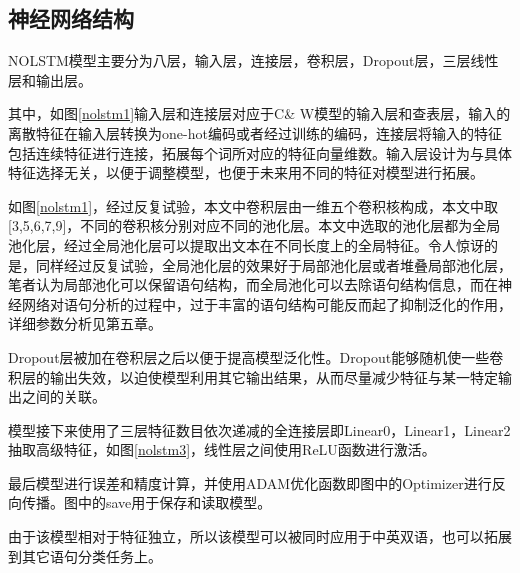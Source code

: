 \subsection{神经网络结构}
NOLSTM模型主要分为八层，输入层，连接层，卷积层，Dropout层，三层线性层和输出层。\par
其中，如图\ref{nolstm1}输入层和连接层对应于C\& W模型的输入层和查表层，输入的离散特征在输入层转换为one-hot编码或者经过训练的编码，连接层将输入的特征包括连续特征进行连接，拓展每个词所对应的特征向量维数。输入层设计为与具体特征选择无关，以便于调整模型，也便于未来用不同的特征对模型进行拓展。\par
如图\ref{nolstm1}，经过反复试验，本文中卷积层由一维五个卷积核构成，本文中取[3,5,6,7,9]，不同的卷积核分别对应不同的池化层。本文中选取的池化层都为全局池化层，经过全局池化层可以提取出文本在不同长度上的全局特征。令人惊讶的是，同样经过反复试验，全局池化层的效果好于局部池化层或者堆叠局部池化层，笔者认为局部池化可以保留语句结构，而全局池化可以去除语句结构信息，而在神经网络对语句分析的过程中，过于丰富的语句结构可能反而起了抑制泛化的作用，详细参数分析见第五章。\par
Dropout层被加在卷积层之后以便于提高模型泛化性。Dropout能够随机使一些卷积层的输出失效，以迫使模型利用其它输出结果，从而尽量减少特征与某一特定输出之间的关联。\par
模型接下来使用了三层特征数目依次递减的全连接层即Linear0，Linear1，Linear2抽取高级特征，如图\ref{nolstm3}，线性层之间使用ReLU函数进行激活。\par
最后模型进行误差和精度计算，并使用ADAM优化函数即图中的Optimizer进行反向传播。图中的save用于保存和读取模型。\par
由于该模型相对于特征独立，所以该模型可以被同时应用于中英双语，也可以拓展到其它语句分类任务上。


